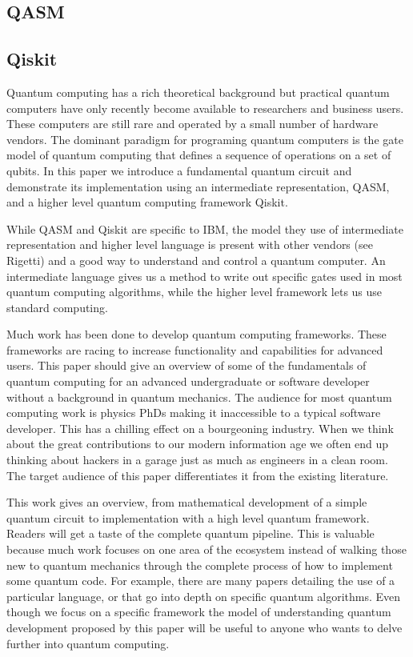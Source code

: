 \documentclass{article}
\begin{document}
\subsection{QASM}
\subsection{Qiskit}
Quantum computing has a rich theoretical background but practical quantum computers have only recently become available to researchers and business users. These computers are still rare and operated by a small number of hardware vendors. The dominant paradigm for programing quantum computers is the gate model of quantum computing that defines a sequence of operations on a set of qubits. In this paper we introduce a fundamental quantum circuit and demonstrate its implementation using an intermediate representation, QASM, and a higher level quantum computing framework Qiskit. 

While QASM and Qiskit are specific to IBM, the model they use of intermediate representation and higher level language is present with other vendors (see Rigetti) and a good way to understand and control a quantum computer. An intermediate language gives us a method to write out specific gates used in most quantum computing algorithms, while the higher level framework lets us use standard computing. 

Much work has been done to develop quantum computing frameworks. These frameworks are racing to increase functionality and capabilities for advanced users. This paper should give an overview of some of the fundamentals of quantum computing for an advanced undergraduate or software developer without a background in quantum mechanics. The audience for most quantum computing work is physics PhDs making it inaccessible to a typical software developer. This has a chilling effect on a bourgeoning industry. When we think about the great contributions to our modern information age we often end up thinking about hackers in a garage just as much as engineers in a clean room. The target audience of this paper differentiates it from the existing literature. 

This work gives an overview, from mathematical development of a simple quantum circuit to implementation with a high level quantum framework. Readers will get a taste of the complete quantum pipeline. This is valuable because much work focuses on one area of the ecosystem instead of walking those new to quantum mechanics through the complete process of how to implement some quantum code. For example, there are many papers detailing the use of a particular language, or that go into depth on specific quantum algorithms. Even though we focus on a specific framework the model of understanding quantum development proposed by this paper will be useful to anyone who wants to delve further into quantum computing. 
\end{document}
